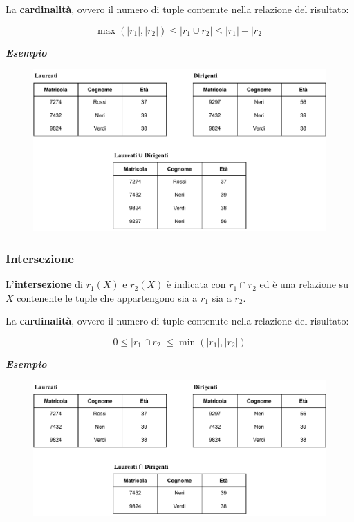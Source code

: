 \documentclass[a4paper]{article}
\begin{document}
	\noindent
	La \textbf{cardinalità}, ovvero il numero di tuple contenute nella relazione del risultato:
	
	\begin{equation*}
		\max\left(|r_{1}|, |r_{2}|\right) \le \left|r_{1} \cup r_{2}\right| \le |r_{1}| + |r_{2}|
	\end{equation*}
	
	\noindent
	\textcolor{Green4}{\textbf{\emph{Esempio}}}
	
	\begin{figure}[!htp]
		\centering
		\includegraphics[width=\textwidth]{img/unione.pdf}
	\end{figure}

	\newpage
	
	\subsubsection{Intersezione}
	
	L'\textcolor{Red3}{\textbf{\underline{intersezione}}} di $r_{1}\left(X\right)$ e $r_{2}\left(X\right)$ è indicata con $r_{1} \cap r_{2}$ ed è una relazione su $X$ contenente le tuple che appartengono sia a $r_{1}$ sia a $r_{2}$.\newline
	
	\noindent
	La \textbf{cardinalità}, ovvero il numero di tuple contenute nella relazione del risultato:
	
	\begin{equation*}
		0 \le \left|r_{1} \cap r_{2}\right| \le \min\left(|r_{1}|, |r_{2}|\right)
	\end{equation*}
	
	\noindent
	\textcolor{Green4}{\textbf{\emph{Esempio}}}
	
	\begin{figure}[!htp]
		\centering
		\includegraphics[width=\textwidth]{img/intersezione.pdf}
	\end{figure}
\end{document}
